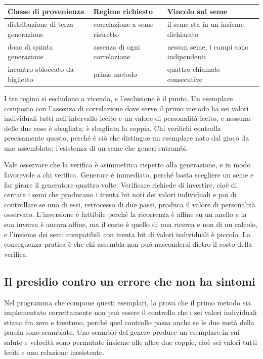 \begin{center}
\begin{tabular}{lll}
\hline
Classe di provenienza & Regime richiesto & Vincolo sul seme \\
\hline
distribuzione di terza generazione & correlazione a seme ristretto & il seme sta in un insieme dichiarato \\
dono di quinta generazione & assenza di ogni correlazione & nessun seme, i campi sono indipendenti \\
incontro sbloccato da biglietto & primo metodo & quattro chiamate consecutive \\
\hline
\end{tabular}
\end{center}

I tre regimi si escludono a vicenda, e l'esclusione è il punto. Un esemplare composto con l'assenza di correlazione dove serve il primo metodo ha sei valori individuali tutti nell'intervallo lecito e un valore di personalità lecito, e nessuna delle due cose è sbagliata; è sbagliata la coppia. Chi verifichi controlla precisamente questo, perché è ciò che distingue un esemplare nato dal gioco da uno assemblato: l'esistenza di un seme che generi entrambi.

Vale osservare che la verifica è asimmetrica rispetto alla generazione, e in modo favorevole a chi verifica. Generare è immediato, perché basta scegliere un seme e far girare il generatore quattro volte. Verificare richiede di invertire, cioè di cercare i semi che producano i trenta bit noti dei valori individuali e poi di controllare se uno di essi, retrocesso di due passi, produca il valore di personalità osservato. L'inversione è fattibile perché la ricorrenza è affine su un anello e la sua inversa è ancora affine, ma il costo è quello di una ricerca e non di un calcolo, e l'insieme dei semi compatibili con trenta bit di valori individuali è piccolo. La conseguenza pratica è che chi assembla non può nascondersi dietro il costo della verifica.

\subsection{Il presidio contro un errore che non ha sintomi}

Nel programma che compone questi esemplari, la prova che il primo metodo sia implementato correttamente non può essere il controllo che i sei valori individuali stiano fra zero e trentuno, perché quel controllo passa anche se le due metà della parola sono scambiate. Uno scambio del genere produce un esemplare in cui salute e velocità sono permutate insieme alle altre due coppie, cioè sei valori tutti leciti e una relazione inesistente.

